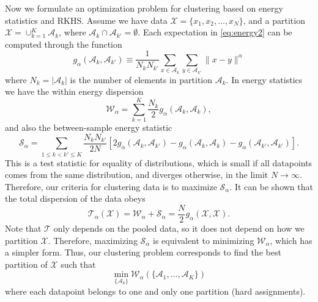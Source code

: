 \documentclass{article}
\begin{document}
Now we formulate an optimization problem for clustering based on 
energy statistics
and RKHS.
Assume we have data $\mathcal{X} = \{ x_1,x_2,\dotsc, x_N \}$,
and a partition $\mathcal{X} = \cup_{k=1}^K \mathcal{A}_k$, where
$\mathcal{A}_k \cap \mathcal{A}_{k'} = \emptyset$.
Each expectation in \eqref{eq:energy2} can be computed 
through the function
\begin{equation}
\label{eq:g_def}
g_\alpha(\mathcal{A}_k, \mathcal{A}_{k'}) \equiv 
\dfrac{1}{N_k N_{k'}}\sum_{x \in \mathcal{A}_k} 
\sum_{y \in \mathcal{A}_{k'}} \| x - y\|^\alpha
\end{equation}
where $N_k = |\mathcal{A}_k|$ is the number of elements in partition
$\mathcal{A}_k$. In energy statistics 
\cite{Szkely2013} we have the within energy dispersion
\begin{equation}
\mathcal{W}_\alpha = 
\sum_{k=1}^{K} \dfrac{N_k}{2} g_\alpha(\mathcal{A}_k, \mathcal{A}_k),
\end{equation}
and also the between-sample energy statistic
\begin{equation}
\mathcal{S}_\alpha = 
\sum_{1 \le  k < k' \le K } \dfrac{N_k N_{k'}}{2 N} \left[
2 g_{\alpha}(\mathcal{A}_k, \mathcal{A}_{k'}) - 
g_{\alpha}(\mathcal{A}_k, \mathcal{A}_{k}) - 
g_{\alpha}(\mathcal{A}_{k'}, \mathcal{A}_{k'})
\right].
\end{equation}
This is a test statistic for equality of distributions, which is small
if all datapoints comes from the same distribution, and diverges otherwise,
in the limit $N \to \infty$. Therefore, our criteria for 
clustering data is to 
maximize $\mathcal{S}_\alpha$.
It can be shown that the total dispersion of the data obeys \cite{Szkely2013}
\begin{equation}
\mathcal{T}_\alpha(\mathcal{X}) 
= \mathcal{W}_\alpha + \mathcal{S}_\alpha = \dfrac{N}{2}
g_{\alpha}(\mathcal{X}, \mathcal{X}). 
\end{equation}
Note that $\mathcal{T}$ only depends on the pooled data, so it 
does not depend on how we partition $\mathcal{X}$. Therefore, maximizing
$\mathcal{S}_\alpha$ is equivalent to minimizing $\mathcal{W}_\alpha$, which
has a simpler form. Thus, our clustering problem corresponds to
find the best partition of $\mathcal{X}$ such that
\begin{equation}\label{eq:minimize}
\min_{\{ \mathcal{A}_k \} } \mathcal{W}_\alpha(\{ 
\mathcal{A}_1, \dotsc, \mathcal{A}_{K}
\})
\end{equation}
where each datapoint belongs to one and only one partition (hard assignments).
\end{document}

